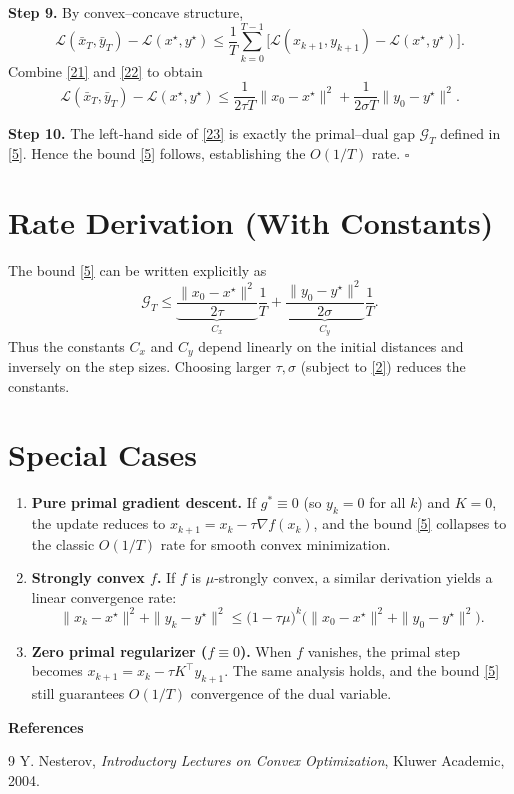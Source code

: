 \documentclass{article}
\begin{document}
\bigskip
\noindent\textbf{Step 9.}  By convex–concave structure,
\[
\mathcal L(\bar x_{T},\bar y_{T})-\mathcal L(x^{\star},y^{\star})
\le \frac{1}{T}\sum_{k=0}^{T-1}\bigl[\mathcal L(x_{k+1},y_{k+1})-\mathcal L(x^{\star},y^{\star})\bigr].
\tag{22}
\]
Combine \eqref{21} and \eqref{22} to obtain
\[
\mathcal L(\bar x_{T},\bar y_{T})-\mathcal L(x^{\star},y^{\star})
\le
\frac{1}{2\tau T}\|x_{0}-x^{\star}\|^{2}
+\frac{1}{2\sigma T}\|y_{0}-y^{\star}\|^{2}.
\tag{23}
\]

\bigskip
\noindent\textbf{Step 10.}  The left‑hand side of \eqref{23} is exactly the primal–dual gap
$\mathcal G_{T}$ defined in \eqref{5}. Hence the bound \eqref{5} follows,
establishing the $O(1/T)$ rate. $\square$

\section*{Rate Derivation (With Constants)}
The bound \eqref{5} can be written explicitly as
\[
\mathcal G_{T}
\le
\underbrace{\frac{\|x_{0}-x^{\star}\|^{2}}{2\tau}}_{C_{x}}
\frac{1}{T}
+
\underbrace{\frac{\|y_{0}-y^{\star}\|^{2}}{2\sigma}}_{C_{y}}
\frac{1}{T}.
\]
Thus the constants $C_{x}$ and $C_{y}$ depend linearly on the initial
distances and inversely on the step sizes. Choosing larger $\tau,\sigma$ (subject to \eqref{2}) reduces the constants.

\section*{Special Cases}
\begin{enumerate}
\item \textbf{Pure primal gradient descent.}  
If $g^{*}\equiv0$ (so $y_{k}=0$ for all $k$) and $K=0$, the update reduces to
$x_{k+1}=x_{k}-\tau\nabla f(x_{k})$, and the bound \eqref{5} collapses to the classic
$O(1/T)$ rate for smooth convex minimization.

\item \textbf{Strongly convex $f$.}  
If $f$ is $\mu$‑strongly convex, a similar derivation yields a linear
convergence rate:
\[
\|x_{k}-x^{\star}\|^{2}+\|y_{k}-y^{\star}\|^{2}\le
\bigl(1-\tau\mu\bigr)^{k}
\bigl(\|x_{0}-x^{\star}\|^{2}+\|y_{0}-y^{\star}\|^{2}\bigr).
\]

\item \textbf{Zero primal regularizer ($f\equiv0$).}  
When $f$ vanishes, the primal step becomes $x_{k+1}=x_{k}-\tau K^{\top}y_{k+1}$.
The same analysis holds, and the bound \eqref{5} still guarantees $O(1/T)$
convergence of the dual variable.
\end{enumerate}

\bigskip
\noindent\textbf{References}\\
\begin{thebibliography}{9}
Y. Nesterov, \emph{Introductory Lectures on Convex Optimization}, Kluwer Academic, 2004.
\end{thebibliography}
\end{document}
